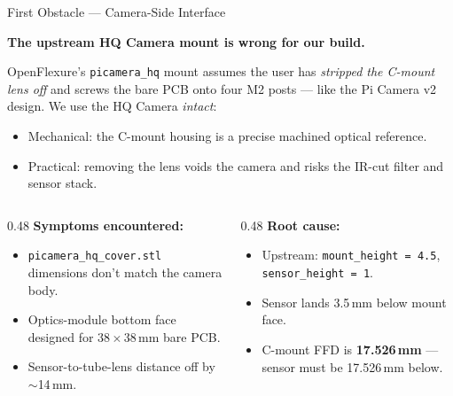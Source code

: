 \documentclass[aspectratio=169,11pt]{beamer}
\begin{document}
\begin{frame}{First Obstacle --- Camera-Side Interface}

  \textbf{The upstream HQ Camera mount is wrong for our build.}

  \vspace{0.2em}

  \footnotesize
  OpenFlexure's \texttt{picamera\_hq} mount assumes the user has \emph{stripped
  the C-mount lens off} and screws the bare PCB onto four M2 posts ---
  like the Pi Camera v2 design. We use the HQ Camera \emph{intact}:
  \begin{itemize}\itemsep=0pt
    \item Mechanical: the C-mount housing is a precise machined optical reference.
    \item Practical: removing the lens voids the camera and risks the IR-cut filter and sensor stack.
  \end{itemize}

  \vspace{0.2em}

  \begin{columns}[T]
    \begin{column}{0.48\textwidth}
      \footnotesize
      \textbf{Symptoms encountered:}
      \begin{itemize}\itemsep=0pt
        \item \texttt{picamera\_hq\_cover.stl} dimensions don't match the camera body.
        \item Optics-module bottom face designed for 38\,$\times$\,38\,mm bare PCB.
        \item Sensor-to-tube-lens distance off by $\sim$14\,mm.
      \end{itemize}
    \end{column}
    \begin{column}{0.48\textwidth}
      \footnotesize
      \textbf{Root cause:}
      \begin{itemize}\itemsep=0pt
        \item Upstream: \texttt{mount\_height = 4.5}, \texttt{sensor\_height = 1}.
        \item Sensor lands 3.5\,mm below mount face.
        \item C-mount FFD is \textbf{17.526\,mm} --- sensor must be 17.526\,mm below.
      \end{itemize}
    \end{column}
  \end{columns}

\end{frame}
\end{document}
